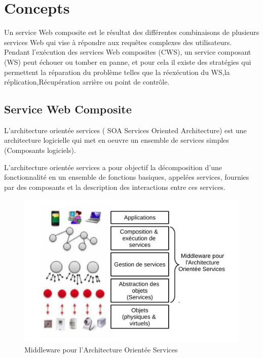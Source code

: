 
\chapter{Concepts}

Un service Web composite est le résultat des différentes combinaisons de plusieurs services Web qui vise à répondre aux requêtes complexes des utilisateurs.
Pendant l'exécution des services Web composites (CWS), un service composant (WS) peut échouer ou tomber en panne, et pour cela il existe des stratégies qui permettent la réparation du problème telles que  la réexécution du WS,la réplication,Récupération arrière ou point de contrôle.

\section{Service Web Composite}

L'architecture orientée services ( SOA Services Oriented Architecture) est une architecture logicielle qui met en oeuvre un ensemble de services simples (Composants logiciels).

L'architecture orientée services a pour objectif la décomposition d'une fonctionnalité en un ensemble de fonctions basiques, appelées services, fournies par des composants et la description des interactions entre ces services.

\begin{figure}[H]
\begin{center}
\includegraphics[width=1\linewidth]{images/MiddlewareSOA.jpg}
\end{center}
\caption{Middleware pour l’Architecture Orientée Services}
\label{fig:1}
\end{figure}

